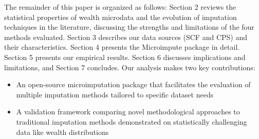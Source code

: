 The remainder of this paper is organized as follows: Section 2 reviews the statistical properties of wealth microdata and the evolution of imputation techniques in the literature, discussing the strengths and limitations of the four methods evaluated. Section 3 describes our data sources (SCF and CPS) and their characteristics. Section 4 presents the Microimpute package in detail. Section 5 presents our empirical results. Section 6 discusses implications and limitations, and Section 7 concludes.
Our analysis makes two key contributions:
\begin{itemize}
    \item An open-source microimputation package that facilitates the evaluation of multiple imputation methods tailored to specific dataset needs
    \item A validation framework comparing novel methodological approaches to traditional imputation methods demonstrated on statistically challenging data like wealth distributions
\end{itemize}
